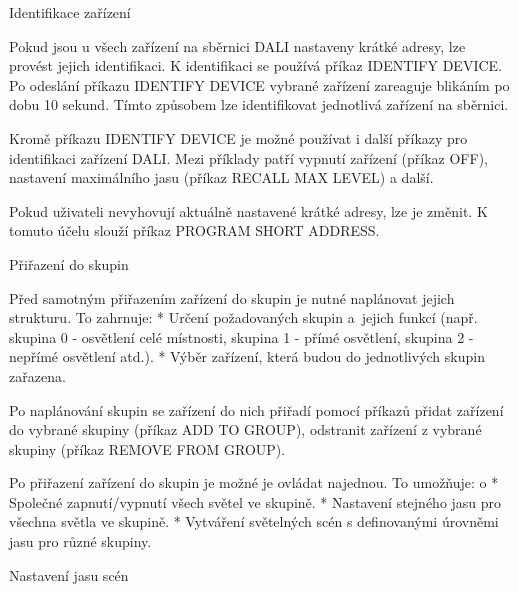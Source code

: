 \medskip \noindent
{\sbf Identifikace zařízení}

Pokud jsou u všech zařízení na sběrnici DALI nastaveny krátké adresy, lze provést jejich identifikaci.
K identifikaci se používá příkaz IDENTIFY DEVICE.
Po odeslání příkazu IDENTIFY DEVICE vybrané zařízení zareaguje blikáním po dobu 10 sekund.
Tímto způsobem lze identifikovat jednotlivá zařízení na sběrnici.


Kromě příkazu IDENTIFY DEVICE je možné používat i další příkazy pro identifikaci zařízení DALI.
Mezi příklady patří vypnutí zařízení (příkaz OFF), nastavení maximálního jasu (příkaz RECALL MAX LEVEL)
a další.

Pokud uživateli nevyhovují aktuálně nastavené krátké adresy, lze je změnit.
K tomuto účelu slouží příkaz PROGRAM SHORT ADDRESS.


\medskip \noindent
{\sbf Přiřazení do skupin}







Před samotným přiřazením zařízení do skupin je nutné naplánovat jejich strukturu. To zahrnuje:
\begitems
    * Určení požadovaných skupin a~jejich funkcí
    (např. skupina 0 - osvětlení celé místnosti, skupina 1 - přímé osvětlení, skupina 2 - nepřímé osvětlení atd.).
    * Výběr zařízení, která budou do jednotlivých skupin zařazena.
\enditems


Po naplánování skupin se zařízení do nich přiřadí pomocí příkazů
přidat zařízení do vybrané skupiny (příkaz ADD TO GROUP),
odstranit zařízení z vybrané skupiny (příkaz REMOVE FROM GROUP).

\noindent
Po přiřazení zařízení do skupin je možné je ovládat najednou. To umožňuje:
\begitems \style o
    * Společné zapnutí/vypnutí všech světel ve skupině.
    * Nastavení stejného jasu pro všechna světla ve skupině.
    * Vytváření světelných scén s definovanými úrovněmi jasu pro různé skupiny.
\enditems

\medskip \noindent
{\sbf Nastavení jasu scén}


